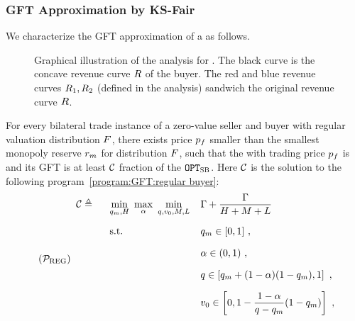 \subsubsection{GFT Approximation by KS-Fair {\FixPrice}}
We characterize the GFT approximation of a {\ksfair} {\FixPrice} as follows.
\begin{figure}
    \centering
    
    \caption{Graphical illustration of the analysis for . The black curve is the concave revenue curve $R$ of the buyer. The red and blue revenue curves $R_1, R_2$ (defined in the analysis) sandwich the original revenue curve $R$.}
    \label{fig:GFT program:regular buyer}
\end{figure}
\begin{lemma}
\label{lem:GFT program:regular buyer}
    For every bilateral trade instance of a zero-value seller and buyer with regular valuation distribution $F$, there exists price $p_f$ smaller than the smallest monopoly reserve $r_m$ for distribution $F$, such that the {\FixPrice} with trading price $p_f$ is {\ksfair} and its GFT is at least $\mathcal{C}$ fraction of the {\SecondBest} $\texttt{OPT}_{\textsc{SB}}$. Here $\mathcal{C}$ is the solution to the following program~\ref{program:GFT:regular buyer}:
    \begin{align}
    \label{program:GFT:regular buyer}
    \tag{$\mathcal{P}_{\mathrm{REG}}$}
    \arraycolsep=5.4pt\def\arraystretch{1}
        \begin{array}{llll}
          \calC \triangleq~~&\min\limits_{\optquant, H}
          ~\max\limits_{\revratio}
          ~\min\limits_{\substack{\quant, \val_0, M, L}}   & 
          \displaystyle\exanteutilratio + \frac{\exanteutilratio}{H + M + L} &
          \vspace{10pt}
          \\
          \vspace{10pt}
          &\text{s.t.}
          & \optquant\in[0, 1]~,  & 
          \\
          \vspace{10pt}
          && \revratio\in(0, 1)~,  & 
          \\ 
          \vspace{10pt}
          && \quant\in \left[\optquant + (1 - \revratio)(1 - \optquant), 1\right]~,  & 
          \\
          \vspace{10pt}
          && \val_0\in \left[0, 1 - \displaystyle\frac{1 - \revratio}{\quant - \optquant}(1 - \optquant)\right]~,  & 

\end{array}
\end{align}
\end{lemma}
